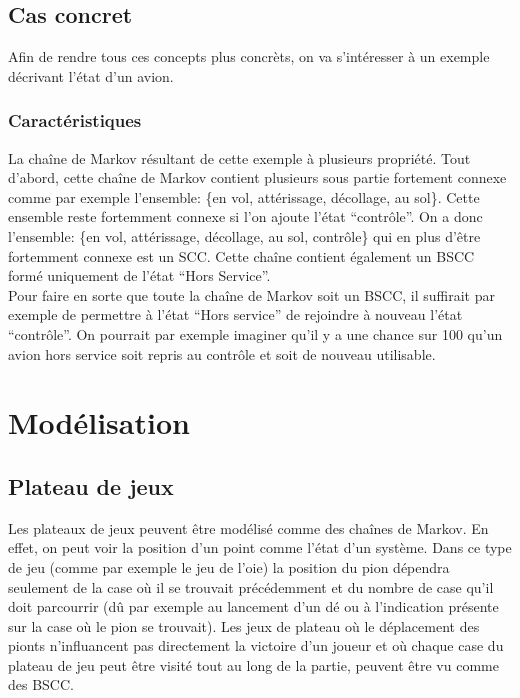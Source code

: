 \documentclass[letterpaper]{article}
\begin{document}
  \subsection{Cas concret}
    \label{casconcret}
    Afin de rendre tous ces concepts plus concrèts, on va s'intéresser à un exemple décrivant
    l'état d'un avion.
    
    \subsubsection{Caractéristiques}
      La chaîne de Markov résultant de cette exemple à plusieurs propriété.  Tout
      d'abord, cette chaîne de Markov contient plusieurs sous partie fortement
      connexe comme par exemple l'ensemble: \{en vol, attérissage, décollage,
      au sol\}.  Cette ensemble reste fortemment connexe si l'on ajoute l'état
      ``contrôle''.  On a donc l'ensemble: \{en vol, attérissage, décollage,
      au sol, contrôle\} qui en plus d'être fortemment connexe est un SCC.
      Cette chaîne contient également un BSCC formé uniquement de l'état 
      ``Hors Service''.\\
      Pour faire en sorte que toute la chaîne de Markov soit un BSCC, il suffirait
      par exemple de permettre à l'état ``Hors service'' de rejoindre à nouveau l'état
      ``contrôle''.  On pourrait par exemple imaginer qu'il y a une chance sur 100 qu'un
      avion hors service soit repris au contrôle et soit de nouveau utilisable.
  
  
\section{Modélisation}

  \subsection{Plateau de jeux}
    Les plateaux de jeux peuvent être modélisé comme des chaînes de Markov.  En effet, on peut 
    voir la position d'un point comme l'état d'un système.  Dans ce type de jeu (comme 
    par exemple le jeu de l'oie) la position du pion dépendra seulement de la case où il 
    se trouvait précédemment et du nombre de case qu'il doit parcourrir (dû par exemple 
    au lancement d'un dé ou à l'indication présente sur la case où le pion se trouvait).
    Les jeux de plateau où le déplacement des pionts n'influancent pas directement la 
    victoire d'un joueur et où chaque case du plateau de jeu peut être visité tout 
    au long de la partie, peuvent être vu comme des BSCC.  
  
\end{document}
